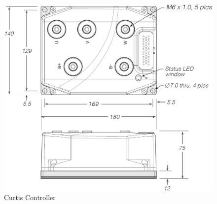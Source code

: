 \begin{figure} [H]
	\begin{center}
		\includegraphics[width=1.05\textwidth]{figures/antrieb/Curtis_CAD.png}
		\caption{Curtis Controller}
		\label{Curtis_CAD}
	\end{center}
\end{figure}

